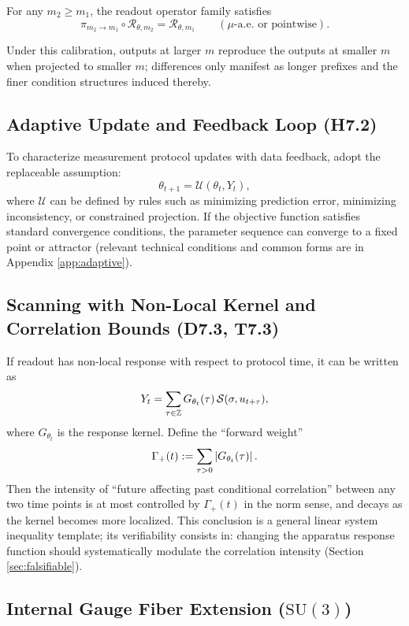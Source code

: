 \begin{assumption}\label{assump:framework-scale-factorization}
For any $m_2\ge m_1$, the readout operator family satisfies
\[
\pi_{m_2\to m_1}\circ \mathcal{R}_{\theta,m_2}=\mathcal{R}_{\theta,m_1}\qquad (\mu\text{-a.e. or pointwise}).
\]
\end{assumption}

Under this calibration, outputs at larger $m$ reproduce the outputs at smaller $m$ when projected to smaller $m$; differences only manifest as longer prefixes and the finer condition structures induced thereby.

\subsection{Adaptive Update and Feedback Loop (H7.2)}

To characterize measurement protocol updates with data feedback, adopt the replaceable assumption:
\[
\theta_{t+1}=\mathcal{U}(\theta_t,Y_t),
\]
where $\mathcal{U}$ can be defined by rules such as minimizing prediction error, minimizing inconsistency, or constrained projection. If the objective function satisfies standard convergence conditions, the parameter sequence can converge to a fixed point or attractor (relevant technical conditions and common forms are in Appendix \ref{app:adaptive}).

\subsection{Scanning with Non-Local Kernel and Correlation Bounds (D7.3, T7.3)}

If readout has non-local response with respect to protocol time, it can be written as
\[
Y_t=\sum_{\tau\in\mathbb{Z}} G_{\theta_t}(\tau)\,\mathcal{S}(\sigma,u_{t+\tau}),
\]
where $G_{\theta_t}$ is the response kernel. Define the ``forward weight''
\[
\Gamma_+(t):=\sum_{\tau>0}\left\lvert G_{\theta_t}(\tau)\right\rvert.
\]
Then the intensity of ``future affecting past conditional correlation'' between any two time points is at most controlled by $\Gamma_+(t)$ in the norm sense, and decays as the kernel becomes more localized. This conclusion is a general linear system inequality template; its verifiability consists in: changing the apparatus response function should systematically modulate the correlation intensity (Section \ref{sec:falsifiable}).

\subsection{Internal Gauge Fiber Extension (\texorpdfstring{$\mathrm{SU}(3)$}{SU(3)})}

